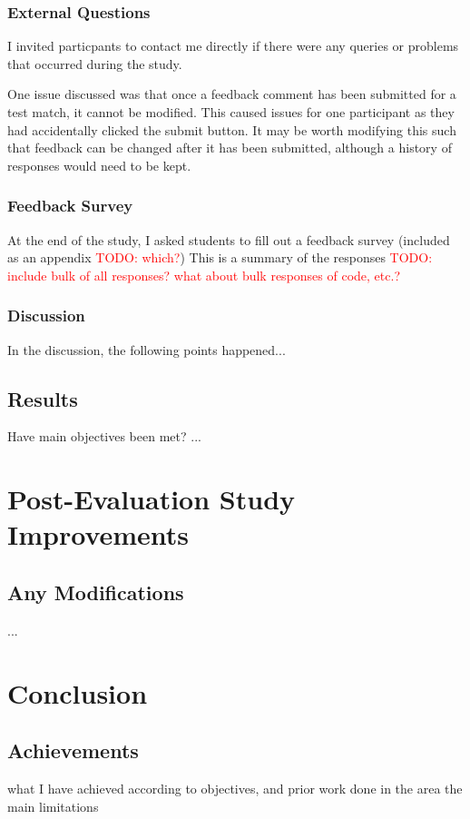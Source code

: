 \documentclass[a4paper,11pt]{report}
\newcommand{\todo}[1]{\textcolor{red}{TODO: #1}}
\begin{document}
\subsection{External Questions}
I invited particpants to contact me directly if there were any queries or problems that occurred during the study.\par
One issue discussed was that once a feedback comment has been submitted for a test match, it cannot be modified. This caused issues for one participant as they had accidentally clicked the submit button. It may be worth modifying this such that feedback can be changed after it has been submitted, although a history of responses would need to be kept.
\subsection{Feedback Survey}
At the end of the study, I asked students to fill out a feedback survey (included as an appendix \todo{which?})
This is a summary of the responses \todo{include bulk of all responses? what about bulk responses of code, etc.?}
\subsection{Discussion}
In the discussion, the following points happened...
\section{Results}
Have main objectives been met?
...

\chapter{Post-Evaluation Study Improvements}
\section{Any Modifications}
...


\chapter{Conclusion}
\section{Achievements}
what I have achieved according to objectives, and prior work done in the area
the main limitations
\end{document}
